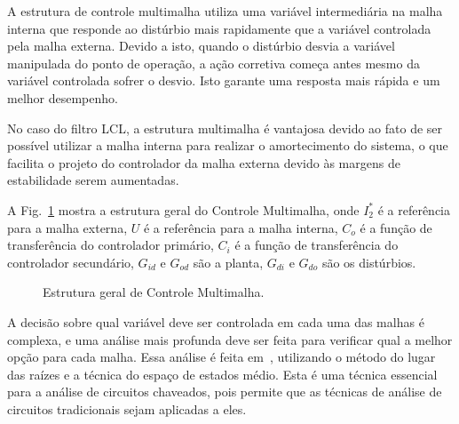 

  A estrutura de controle multimalha utiliza uma variável intermediária na malha interna que responde ao distúrbio mais rapidamente que a variável controlada pela malha externa. Devido a isto, quando o distúrbio desvia a variável manipulada do ponto de operação, a ação corretiva começa antes mesmo da variável controlada sofrer o desvio. Isto garante uma resposta mais rápida e um melhor desempenho.

  No caso do filtro LCL, a estrutura multimalha é vantajosa devido ao fato de ser possível utilizar a malha interna para realizar o amortecimento do sistema, o que facilita o projeto do controlador da malha externa devido às margens de estabilidade serem aumentadas.

  A Fig.~\ref{fig:multiloop} mostra a estrutura geral do Controle Multimalha, onde $I_2^*$ é a referência para a malha externa, $U$ é a referência para a malha interna, $C_o$ é a função de transferência do controlador primário, $C_i$ é a função de transferência do controlador secundário, $G_{id}$ e $G_{od}$ são a planta, $G_{di}$ e $G_{do}$ são os distúrbios.


  \begin{figure}[htb]
    \renewcommand\figurename{Fig.}
    \caption{Estrutura geral de Controle Multimalha.}
    \label{fig:multiloop}
  \end{figure}

  A decisão sobre qual variável deve ser controlada em cada uma das malhas é complexa, e uma análise mais profunda deve ser feita para verificar qual a melhor opção para cada malha. Essa análise é feita em~\cite{ref:NASER}, utilizando o método do lugar das raízes e a técnica do espaço de estados médio. Esta é uma técnica essencial para a análise de circuitos chaveados, pois permite que as técnicas de análise de circuitos tradicionais sejam aplicadas a eles.


